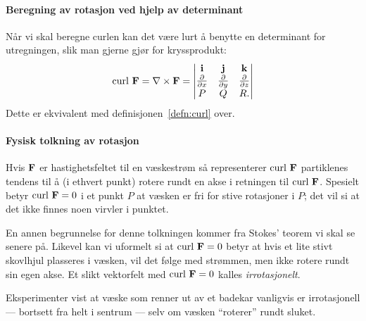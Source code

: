 \paragraph{Beregning av rotasjon ved hjelp av determinant}
Når vi skal beregne curlen kan det være lurt å benytte en determinant for utregningen, slik man gjerne gjør for kryssprodukt:
\[
\text{curl } \mathbf{F} = \nabla \times \mathbf{F} =
\begin{vmatrix}
\mathbf{i} & \mathbf{j} & \mathbf{k} \\
\frac{\partial}{\partial x} & \frac{\partial}{\partial y} & \frac{\partial}{\partial z} \\
P & Q & R.
\end{vmatrix}
\]
Dette er ekvivalent med definisjonen~\ref{defn:curl} over.


\paragraph{Fysisk tolkning av rotasjon} Hvis $\mathbf{F}$ er hastighetsfeltet til en væskestrøm så representerer $\text{curl } \mathbf{F}$ partiklenes tendens til å (i ethvert punkt) rotere rundt en akse i retningen til $\text{curl } \mathbf{F}$. Spesielt betyr $\text{curl } \mathbf{F} = 0$ i et punkt $P$ at væsken er fri for stive rotasjoner i $P$; det vil si at det ikke finnes noen virvler i punktet. 

En annen begrunnelse for denne tolkningen kommer fra Stokes' teorem  vi skal se senere på. Likevel kan vi uformelt si at $\text{curl } \mathbf{F} = 0$ betyr at hvis et lite stivt skovlhjul plasseres i væsken, vil det følge med strømmen, men ikke rotere rundt sin egen akse. Et slikt vektorfelt med $\text{curl } \mathbf{F} = 0$ kalles \emph{irrotasjonelt}.

Eksperimenter vist at væske som renner ut av et badekar vanligvis er irrotasjonell — bortsett fra helt i sentrum — selv om væsken “roterer” rundt sluket. 


